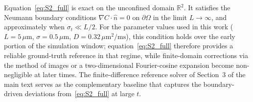\documentclass[12pt]{article}
\begin{document}
Equation~\eqref{eq:S2_full} is exact on the unconfined domain
$\mathbb{R}^2$. It satisfies the Neumann boundary conditions
$\nabla C \cdot \hat{n} = 0$ on $\partial \Omega$ in the limit
$L \to \infty$, and approximately when $\sigma_t \ll L/2$.
For the parameter values used in this work
($L = 5\,\mu\text{m}$, $\sigma = 0.5\,\mu\text{m}$,
$D = 0.32\,\mu\text{m}^2/\text{ms}$), this condition holds over
the early portion of the simulation window; equation~\eqref{eq:S2_full}
therefore provides a reliable ground-truth reference in that
regime, while finite-domain corrections via the method of images
or a two-dimensional Fourier-cosine expansion become non-negligible
at later times. The finite-difference reference solver of
Section~3 of the main text serves as the complementary baseline
that captures the boundary-driven deviations from~\eqref{eq:S2_full}
at large $t$.
\end{document}
